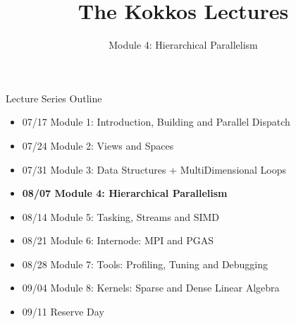 
\def\sandid{SAND2020-7475 PE}

\title{The Kokkos Lectures}

\author{Module 4: Hierarchical Parallelism}




\shortfalse
\mediumtrue
\fulltrue
\notoverviewtrue



% 

\begin{frame}
	\titlepage
\end{frame}



\begin{frame}[fragile]{Lecture Series Outline}

\begin{itemize}
        \item 07/17 Module 1: Introduction, Building and Parallel Dispatch
        \item 07/24 Module 2: Views and Spaces
        \item 07/31 Module 3: Data Structures + MultiDimensional Loops
        \item \textbf{08/07 Module 4: Hierarchical Parallelism}
        \item 08/14 Module 5: Tasking, Streams and SIMD
        \item 08/21 Module 6: Internode: MPI and PGAS
        \item 08/28 Module 7: Tools: Profiling, Tuning and Debugging
        \item 09/04 Module 8: Kernels: Sparse and Dense Linear Algebra
        \item 09/11 Reserve Day
\end{itemize}

\end{frame}

